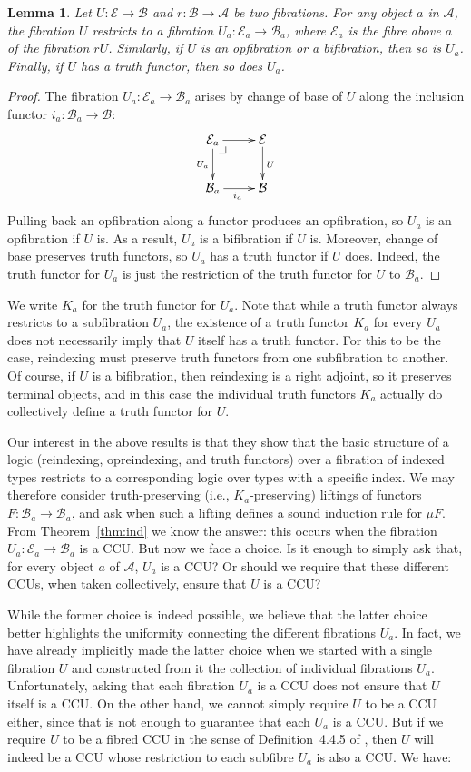 \documentclass{LMCS}
\makeatletter
\newcommand{\ra}{\rightarrow}
\newcommand\lpbc[1][dr]{\save*!/#1-1.2pc/#1:(-1,1)@^{|-}\restore}
\newcommand\E{{\mathcal E}}
\newcommand\B{{\mathcal B}}
\newcommand\A{{\mathcal A}}
\theoremstyle{plain}
\newtheorem{lemma}[theorem]{Lemma}
\theoremstyle{remark}
\theoremstyle{definition}
\makeatother
\begin{document}
\begin{lemma}\label{lem:fibredfib}
  Let $U:\E\to\B$ and $r:\B\to\A$ be two fibrations. For any object
  $a$ in $\A$, the fibration $U$ restricts to a fibration
  $U_a:\E_a\to\B_a$, where $\E_a$ is the fibre above $a$ of the
  fibration $r U$. Similarly, if $U$ is an opfibration or a
  bifibration, then so is $U_a$. Finally, if $U$ has a truth functor,
  then so does $U_a$.
\end{lemma}
\begin{proof}
  The fibration $U_a: \E_a \ra \B_a$ arises by change of base of $U$
  along the inclusion functor $i_a:\B_a \ra \B$:
 \[\xymatrix{
   \E_a\ar[d]_{U_a}\ar[r] \lpbc & \E\ar[d]^U\\
   \B_a\ar[r]_{i_a} & \B}
 \]
Pulling back an opfibration along a functor produces an opfibration,
so $U_a$ is an opfibration if $U$ is. As a result, $U_a$ is a
bifibration if $U$ is. Moreover, change of base preserves truth
functors, so $U_a$ has a truth functor if $U$ does. Indeed, the truth
functor for $U_a$ is just the restriction of the truth functor for $U$
to $\B_a$.
\end{proof}
\noindent
We write $K_a$ for the truth functor for $U_a$. Note that while a
truth functor always restricts to a subfibration $U_a$, the existence
of a truth functor $K_a$ for every $U_a$ does not necessarily imply
that $U$ itself has a truth functor. For this to be the case,
reindexing must preserve truth functors from one subfibration to
another. Of course, if $U$ is a bifibration, then reindexing is a
right adjoint, so it preserves terminal objects, and in this case the
individual truth functors $K_a$ actually do collectively define a
truth functor for $U$.

Our interest in the above results is that they show that the basic
structure of a logic (reindexing, opreindexing, and truth functors)
over a fibration of indexed types restricts to a corresponding logic
over types with a specific index. We may therefore consider
truth-preserving (i.e., $K_a$-preserving) liftings of functors $F:\B_a
\ra \B_a$, and ask when such a lifting defines a sound induction rule
for $\mu F$.  From Theorem~\ref{thm:ind} we know the answer: this
occurs when the fibration $U_a:\E_a \ra \B_a$ is a CCU. But now we
face a choice. Is it enough to simply ask that, for every object $a$
of $\A$, $U_a$ is a CCU? Or should we require that these different
CCUs, when taken collectively, ensure that $U$ is a CCU?

While the former choice is indeed possible, we believe that the latter
choice better highlights the uniformity connecting the different
fibrations $U_a$. In fact, we have already implicitly made the latter
choice when we started with a single fibration $U$ and constructed
from it the collection of individual fibrations $U_a$. Unfortunately,
asking that each fibration $U_a$ is a CCU does not ensure that $U$
itself is a CCU.
On the other hand, we cannot simply require $U$ to be a CCU either,
since that is not enough to guarantee that each $U_a$ is a CCU. But if
we require $U$ to be a fibred CCU in the sense of Definition~4.4.5 of
\cite{jac91}, then $U$ will indeed be a CCU whose restriction to each
subfibre $U_a$ is also a CCU. We have:
\end{document}

